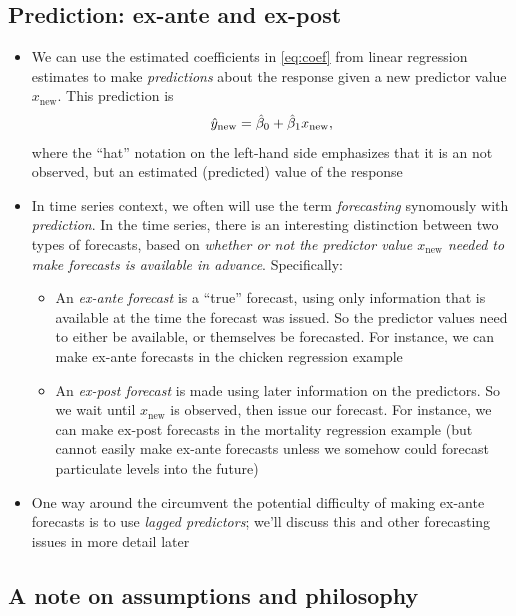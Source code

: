 \documentclass{article}
\begin{document}
\subsection{Prediction: ex-ante and ex-post}

\begin{itemize}
\item We can use the estimated coefficients   in
  \eqref{eq:coef} from linear regression estimates to make \emph{predictions}
  about the response given a new predictor value $x_{\text{new}}$. This
  prediction is  
  \[
  \hat{y}_{\text{new}} = \hat{\beta}_0 + \hat{\beta}_1 x_{\text{new}},
  \]
  where the ``hat'' notation on the left-hand side emphasizes that it is an not  
  observed, but an estimated (predicted) value of the response

\item In time series context, we often will use the term \emph{forecasting}
  synomously with \emph{prediction}. In the time series, there is an interesting
  distinction between two types of forecasts, based on \emph{whether or not the
    predictor value $x_{\text{new}}$ needed to make forecasts is available in
    advance}. Specifically:   
  \begin{itemize}
  \item An \emph{ex-ante forecast} is a ``true'' forecast, using only
    information that is available at the time the forecast was issued. So the
    predictor values need to either be available, or themselves be
    forecasted. For instance, we can make ex-ante forecasts in the chicken 
    regression example

  \item An \emph{ex-post forecast} is made using later information on the
    predictors. So we wait until $x_{\text{new}}$ is observed, then issue our
    forecast. For instance, we can make ex-post forecasts in the mortality
    regression example (but cannot easily make ex-ante forecasts unless we 
    somehow could forecast particulate levels into the future)
  \end{itemize}

\item One way around the circumvent the potential difficulty of making ex-ante
  forecasts is to use \emph{lagged predictors}; we'll discuss this and other
  forecasting issues in more detail later
\end{itemize}

\subsection{A note on assumptions and philosophy}
\end{document}
